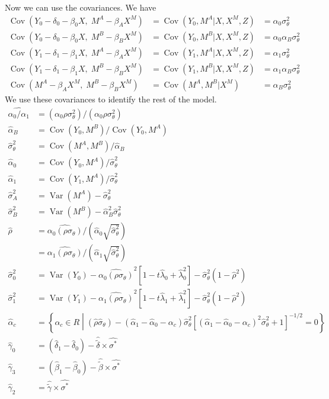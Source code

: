 \documentclass[11pt,letterpaper]{article}
\DeclareMathOperator{\Var}{Var}
\DeclareMathOperator{\Cov}{Cov}
\begin{document}
Now we can use the covariances. We have
\begin{align*}
\Cov(Y_0 - \delta_0 - \beta_0 X,\; M^A - \beta_A X^M) &= \Cov(Y_0, M^A | X, X^M, Z) &= \alpha_0 \sigma^2_\theta \\
\Cov(Y_0 - \delta_0 - \beta_0 X,\; M^B - \beta_B X^M) &= \Cov(Y_0, M^B | X, X^M, Z) &= \alpha_0 \alpha_B \sigma^2_\theta \\
\Cov(Y_1 - \delta_1 - \beta_1 X,\; M^A - \beta_A X^M) &= \Cov(Y_1, M^A | X, X^M, Z) &= \alpha_1 \sigma^2_\theta \\
\Cov(Y_1 - \delta_1 - \beta_1 X,\; M^B - \beta_B X^M) &= \Cov(Y_1, M^B | X, X^M, Z) &= \alpha_1 \alpha_B \sigma^2_\theta \\
\Cov(M^A - \beta_A X^M         ,\; M^B - \beta_B X^M) &= \Cov(M^A, M^B | X^M      ) &= \alpha_B \sigma^2_\theta
\end{align*}
We use these covariances to identify the rest of the model. 
\begin{align*}
\widehat{\alpha_0 / \alpha_1} &= (\alpha_0\rho\sigma^2_\theta)/(\alpha_0\rho\sigma^2_\theta) \\
\widehat \alpha_B &= \Cov(Y_0, M^B)/\Cov(Y_0, M^A)  \\
\widehat \sigma^2_\theta &= \Cov(M^A, M^B)/\widehat \alpha_B  \\
\widehat \alpha_0 &= \Cov(Y_0, M^A)/ \widehat\sigma_\theta^2  \\
\widehat \alpha_1 &= \Cov(Y_1, M^A)/ \widehat\sigma_\theta^2  \\
\widehat \sigma^2_A &= \Var(M^A) - \widehat\sigma^2_\theta  \\
\widehat \sigma^2_B  &= \Var(M^B) - \widehat \alpha_B^2 \widehat \sigma^2_\theta  \\
\widehat \rho &= \widehat{ \alpha_0 (\rho\sigma_\theta)} / (\widehat \alpha_0 \sqrt{\widehat \sigma_\theta^2})  \\
              &= \widehat{ \alpha_1 (\rho\sigma_\theta)} / (\widehat \alpha_1 \sqrt{\widehat \sigma_\theta^2})  \\
\widehat \sigma_0^2 &= \Var(Y_0) - \widehat{ \alpha_0 (\rho\sigma_\theta)}^2\left[ 1 - t\widehat \lambda_0 + \widehat \lambda_0^2 \right] - \widehat \sigma^2_\theta(1-\widehat \rho^2) \\
\widehat \sigma_1^2 &= \Var(Y_1) - \widehat{ \alpha_1 (\rho\sigma_\theta)}^2\left[ 1 - t\widehat \lambda_1 + \widehat \lambda_1^2 \right] - \widehat \sigma^2_\theta(1-\widehat \rho^2) \\
\widehat \alpha_c &= \left\{ \alpha_c \in R \middle | (\widehat \rho \widehat \sigma_\theta) - (\widehat \alpha_1 - \widehat \alpha_0 - \alpha_c)\widehat \sigma^2_\theta \left[(\widehat \alpha_1 - \widehat \alpha_0 - \alpha_c)^2 \widehat \sigma_\theta^2 + 1 \right]^{-1/2} =0 \right\} \\
\widehat \gamma_0 &= \left( \widehat \delta_1 -\widehat \delta_0 \right) - \widehat{\widetilde{\delta}} \times \widehat{\sigma^*} \\
\widehat \gamma_3 &= \left( \widehat \beta_1 - \widehat\beta_0 \right) - \widehat{\widetilde{\beta}} \times \widehat {\sigma^*} \\
\widehat \gamma_2 &= \widehat{\widetilde \gamma}\times \widehat{\sigma^*}
\end{align*}
\end{document}
